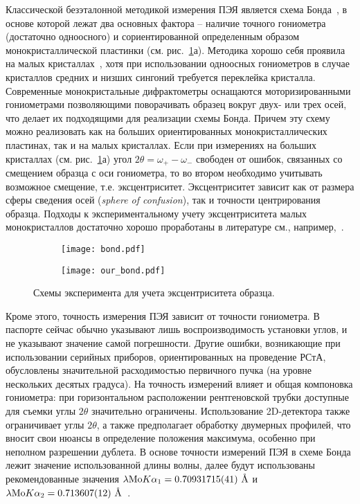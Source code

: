 Классической безэталонной методикой измерения ПЭЯ является схема Бонда~\cite{Bond:1960}, в основе которой лежат два основных фактора – наличие точного гониометра (достаточно одноосного) и сориентированной определенным образом монокристаллической пластинки (см. рис.~\ref{fig:bond}а).
Методика хорошо себя проявила на малых кристаллах~\cite{Lisoivan:1988}, хотя при использовании одноосных гониометров в случае кристаллов средних и низших сингоний требуется переклейка кристалла.
Современные монокристальные дифрактометры оснащаются моторизированными гониометрами позволяющими поворачивать образец вокруг двух- или трех осей, что делает их подходящими для реализации схемы Бонда.
Причем эту схему можно реализовать как на больших ориентированных монокристаллических пластинах, так и на малых кристаллах.
Если при измерениях на больших кристаллах (см. рис.~\ref{fig:bond}а) угол $2\theta = \omega_+ - \omega_-$ свободен от ошибок, связанных со смещением образца с оси гониометра, то во втором необходимо учитывать возможное смещение, т.е. эксцентриситет.
Эксцентриситет зависит как от размера сферы сведения осей (\textit{sphere of confusion}), так и точности центрирования образца.
Подходы к экспериментальному учету эксцентриситета малых монокристаллов достаточно хорошо проработаны в литературе см., например,~\cite{Ponomarev:1969,King:1979}.

\begin{figure}[ht!]
    \centering
    \begin{subfigure}{0.5\textwidth}
    \centering
    \texttt{[image: bond.pdf]}
    \caption{}%
    \label{fig:bond}
    \end{subfigure}%
    \begin{subfigure}{0.5\textwidth}
    \centering
    \texttt{[image: our\_bond.pdf]}
    \caption{}%
    \label{fig:our_bond}
    \end{subfigure}
    \caption{Схемы эксперимента для учета эксцентриситета образца.}%
\end{figure}

Кроме этого, точность измерения ПЭЯ зависит от точности гониометра.
В паспорте сейчас обычно указывают лишь воспроизводимость установки углов, и не указывают значение самой погрешности.
Другие ошибки, возникающие при использовании серийных приборов, ориентированных на проведение РСтА, обусловлены значительной расходимостью первичного пучка (на уровне нескольких десятых градуса).
На точность измерений влияет и общая компоновка гониометра: при горизонтальном расположении рентгеновской трубки доступные для съемки углы $2\theta$ значительно ограничены.
Использование 2D-детектора также ограничивает углы $2\theta$, а также предполагает обработку двумерных профилей, что вносит свои нюансы в определение положения максимума, особенно при неполном разрешении дублета.
В основе точности измерений ПЭЯ в схеме Бонда лежит значение использованной длины волны, далее будут использованы рекомендованные значения $\lambda \text{Mo} K \alpha_1 = 0.70931715 (41)\ \text{\AA}$ и $\lambda \text{Mo} K \alpha_2 = 0.713607 (12)\ \text{\AA}$~\cite{Deslattes:1985}.

